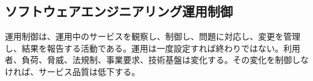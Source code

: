 \subsection{ソフトウェアエンジニアリング運用制御}

運用制御は、運用中のサービスを観察し、制御し、問題に対応し、変更を管理し、結果を報告する活動である。運用は一度設定すれば終わりではない。利用者、負荷、脅威、法規制、事業要求、技術基盤は変化する。その変化を制御しなければ、サービス品質は低下する。
